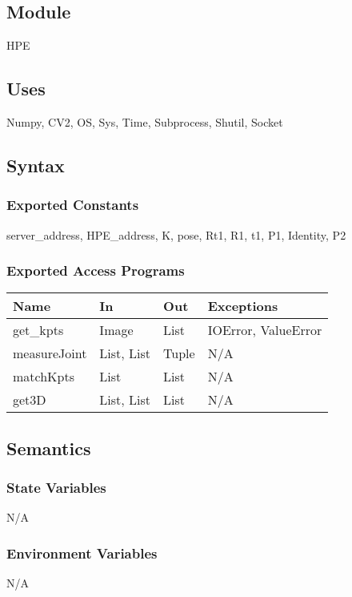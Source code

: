 \documentclass[12pt, titlepage]{article}
\begin{document}
\subsection{Module}
HPE

\subsection{Uses}
Numpy, CV2, OS, Sys, Time, Subprocess, Shutil, Socket

\subsection{Syntax}

\subsubsection{Exported Constants}
server\_address, HPE\_address, K, pose, Rt1, R1, t1, P1, Identity, P2

\subsubsection{Exported Access Programs}
\begin{table}[h!]
  \centering
  \begin{tabular}{llll}
    \hline
    \textbf{Name}      & \textbf{In}      & \textbf{Out} & \textbf{Exceptions}       \\
    \hline
    get\_kpts    & Image      & List   & IOError, ValueError \\
    measureJoint & List, List & Tuple  & N/A                 \\
    matchKpts    & List       & List   & N/A                 \\
    get3D        & List, List & List   & N/A                 \\
    \hline
  \end{tabular}
\end{table}

\subsection{Semantics}

\subsubsection{State Variables}
N/A

\subsubsection{Environment Variables}
N/A
\end{document}
